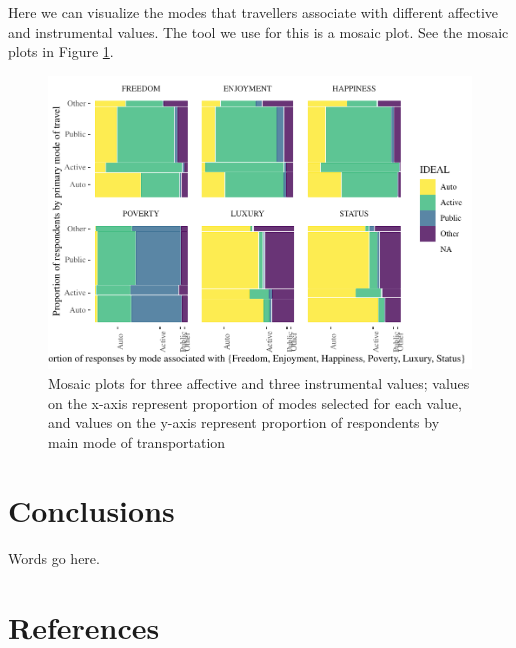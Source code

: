 \documentclass[]{elsarticle} %
\makeatletter
\def\maxwidth{\ifdim\Gin@nat@width>\linewidth\linewidth
\else\Gin@nat@width\fi}
\let\Oldincludegraphics\includegraphics
\renewcommand{\includegraphics}[1]{\Oldincludegraphics[width=\maxwidth]{#1}}
\makeatother
\begin{document}
Here we can visualize the modes that travellers associate with different
affective and instrumental values. The tool we use for this is a mosaic
plot. See the mosaic plots in Figure
\ref{fig:mosaic-plots-by-attribute}.

\begin{figure}
\centering
\includegraphics{Dissonance_Santiago_v1_files/figure-latex/figure-mosaic-plots-by-attribute-without-instrumental-1.pdf}
\caption{\label{fig:mosaic-plots-by-attribute}Mosaic plots for three
affective and three instrumental values; values on the x-axis represent
proportion of modes selected for each value, and values on the y-axis
represent proportion of respondents by main mode of transportation}
\end{figure}

\hypertarget{conclusions}{%
\section{Conclusions}\label{conclusions}}

Words go here.

\hypertarget{references}{%
\section*{References}\label{references}}
\end{document}
